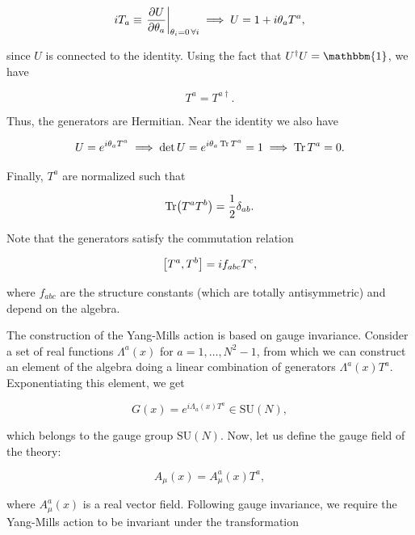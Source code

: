 \documentclass[reqno,12pt]{article}
\numberwithin{equation}{section}
\newcommand{\SU}{\mathrm{SU}}
\newcommand{\id}{\mathbbm{1}}
\begin{document}
\begin{equation}
	iT_a \equiv \eval{\pdv{U}{\theta_a}}_{\theta_i = 0\,\forall i} \implies U = 1 + i \theta_aT^a,
\end{equation}

since $U$ is connected to the identity. Using the fact that $U^\dagger U = \id$, we have

\begin{equation}
	T^a = T^{a \dagger}.
\end{equation}

Thus, the generators are Hermitian. Near the identity we also have

\begin{equation}
	U = e^{i\theta_a T^a} \implies \det U = e^{i\theta_a \Tr T^a} = 1 \implies \Tr T^a = 0.
\end{equation}

Finally, $T^a$ are normalized such that

\begin{equation}
	\Tr(T^a T^b) = \frac{1}{2}\delta_{ab}.
\end{equation}

Note that the generators satisfy the commutation relation

\begin{equation}
	\qty[T^a, T^b] = if_{abc} T^c,	
\end{equation}

where $f_{abc}$ are the structure constants (which are totally antisymmetric) and depend on the algebra. 

The construction of the Yang-Mills action is based on gauge invariance. Consider a set of real functions $\Lambda^a(x)$ 
for $a = 1, \dots, N^2 - 1$, from which we can construct an element of the algebra doing a linear combination of generators
$\Lambda^a(x)T^a$. Exponentiating this element, we get 

\begin{equation} \label{eq:gauge_trans}
	G(x) = e^{i \Lambda_a(x) T^a} \in \SU(N),
\end{equation}

which belongs to the gauge group $\SU(N)$. Now, let us define the gauge field of the theory: 

\begin{equation}
	A_\mu(x) = A_\mu^a(x) T^a,
\end{equation}

where $A_\mu^a(x)$ is a real vector field. Following gauge invariance, we require the Yang-Mills action to be invariant
under the transformation
\end{document}
